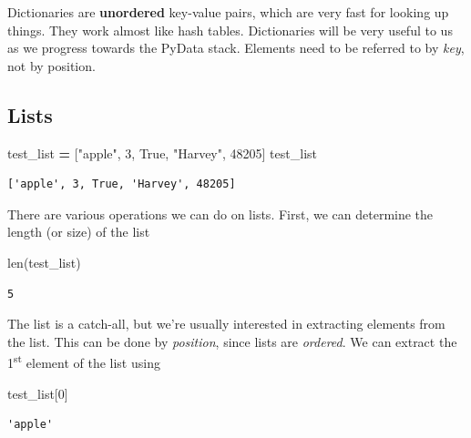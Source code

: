 \documentclass[
  letterpaper,
]{scrbook}
\newenvironment{Shaded}{\begin{snugshade}}{\end{snugshade}}
\newcommand{\BuiltInTok}[1]{#1}
\newcommand{\DecValTok}[1]{\textcolor[rgb]{0.00,0.00,0.81}{#1}}
\newcommand{\NormalTok}[1]{#1}
\newcommand{\OperatorTok}[1]{\textcolor[rgb]{0.81,0.36,0.00}{\textbf{#1}}}
\newcommand{\StringTok}[1]{\textcolor[rgb]{0.31,0.60,0.02}{#1}}
\newcommand{\VariableTok}[1]{\textcolor[rgb]{0.00,0.00,0.00}{#1}}
\begin{document}
Dictionaries are \textbf{unordered} key-value pairs, which are very fast for looking up things. They work almost like hash tables. Dictionaries will be very useful to us as we progress towards the PyData stack. Elements need to be referred to by \emph{key}, not by position.

\hypertarget{lists}{%
\subsection{Lists}\label{lists}}

\begin{Shaded}
\begin{Highlighting}[]
\NormalTok{test_list }\OperatorTok{=}\NormalTok{ [}\StringTok{"apple"}\NormalTok{, }\DecValTok{3}\NormalTok{, }\VariableTok{True}\NormalTok{, }\StringTok{"Harvey"}\NormalTok{, }\DecValTok{48205}\NormalTok{]}
\NormalTok{test_list}
\end{Highlighting}
\end{Shaded}

\begin{verbatim}
['apple', 3, True, 'Harvey', 48205]
\end{verbatim}

There are various operations we can do on lists. First, we can determine the length (or size) of the list

\begin{Shaded}
\begin{Highlighting}[]
\BuiltInTok{len}\NormalTok{(test_list)}
\end{Highlighting}
\end{Shaded}

\begin{verbatim}
5
\end{verbatim}

The list is a catch-all, but we're usually interested in extracting elements from the list. This can be done by \emph{position}, since lists are \emph{ordered}. We can extract the 1\textsuperscript{st} element of the list using

\begin{Shaded}
\begin{Highlighting}[]
\NormalTok{test_list[}\DecValTok{0}\NormalTok{]}
\end{Highlighting}
\end{Shaded}

\begin{verbatim}
'apple'
\end{verbatim}
\end{document}
